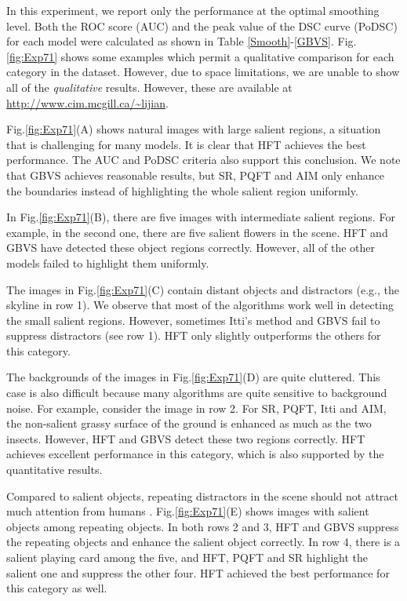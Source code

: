 \documentclass[10pt,journal,cspaper,compsoc]{IEEEtran}
\begin{document}
In this experiment, we report only the performance at the optimal smoothing level. Both the ROC score (AUC) and the peak value of the DSC curve (PoDSC) for each model were calculated as shown in Table \ref{Smooth}-\ref{GBVS}. Fig.\ref{fig:Exp71} shows some examples which permit a qualitative comparison for each category in the dataset. However, due to space limitations, we are unable to show all of the {\it qualitative} results. However, these are available at \url{http://www.cim.mcgill.ca/~lijian}.


Fig.\ref{fig:Exp71}(A) shows natural images with large salient regions, a situation that is challenging for many models. It is clear that HFT achieves the best performance. The AUC and PoDSC criteria also support this conclusion. We note that GBVS achieves reasonable results, but SR, PQFT and AIM only enhance the boundaries instead of highlighting the whole salient region uniformly.

In Fig.\ref{fig:Exp71}(B), there are five images with intermediate salient regions. For example, in the second one, there are five salient flowers in the scene. HFT and GBVS have detected these object regions correctly. However, all of the other models failed to highlight them uniformly.

The images in  Fig.\ref{fig:Exp71}(C) contain distant objects and distractors (e.g., the skyline in row 1). We observe that most of the algorithms work well in detecting the small salient regions. However, sometimes Itti's method and GBVS fail to suppress distractors (see row 1). HFT only slightly outperforms the others for this category.


The backgrounds of the images in Fig.\ref{fig:Exp71}(D) are quite cluttered. This case is also difficult because many algorithms are quite sensitive to background noise. For example, consider the image in row 2. For SR, PQFT, Itti and AIM, the non-salient grassy surface of the ground is enhanced as much as the two insects. However, HFT and GBVS detect these two regions correctly. HFT achieves excellent performance in this category, which is also supported by the quantitative results.

Compared to salient objects, repeating distractors in the scene should not attract much attention from humans \cite{beck2005stimulus}. Fig.\ref{fig:Exp71}(E) shows images with salient objects among repeating objects. In both rows 2 and 3, HFT and GBVS suppress the repeating objects and enhance the salient object correctly. In row 4, there is a salient playing card among the five, and HFT, PQFT and SR highlight the salient one and suppress the other four. HFT achieved the best performance for this category as well.
\end{document}
